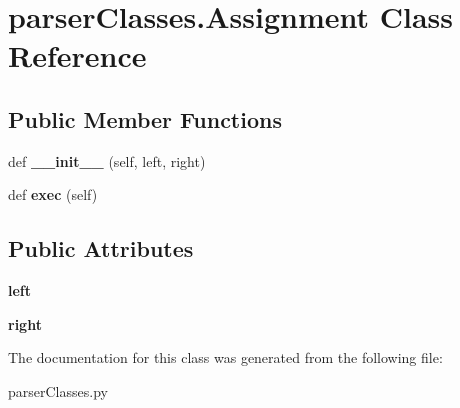 \hypertarget{classparser_classes_1_1_assignment}{}\section{parser\+Classes.\+Assignment Class Reference}
\label{classparser_classes_1_1_assignment}
\subsection*{Public Member Functions}
\begin{DoxyCompactItemize}
\item 
\mbox{\label{classparser_classes_1_1_assignment_a43da5ff93b04c80d9a466dcebd309d00}} 
def {\bfseries \+\_\+\+\_\+init\+\_\+\+\_\+} (self, left, right)
\item 
\mbox{\label{classparser_classes_1_1_assignment_a3c1e04ff93d19320677466afea6365bb}} 
def {\bfseries exec} (self)
\end{DoxyCompactItemize}
\subsection*{Public Attributes}
\begin{DoxyCompactItemize}
\item 
\mbox{\label{classparser_classes_1_1_assignment_ae986cc4a7cfecdaa4e3f63d14dbe88ef}} 
{\bfseries left}
\item 
\mbox{\label{classparser_classes_1_1_assignment_a422e2e0ef9731ceee7bc8ac30a226f1c}} 
{\bfseries right}
\end{DoxyCompactItemize}


The documentation for this class was generated from the following file\+:\begin{DoxyCompactItemize}
\item 
parser\+Classes.\+py\end{DoxyCompactItemize}
